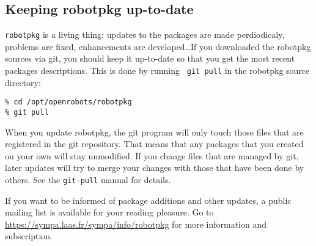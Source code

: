 \subsection{Keeping robotpkg up-to-date} %

{\tt robotpkg} is   a   living thing:    updates  to  the packages are     made
perdiodicaly,  problems are fixed,   enhancements  are developed\ldots If   you
downloaded the robotpkg sources via git, you  should keep it up-to-date so that
you get the most  recent packages descriptions. This is done by running {\tt
git pull} in the robotpkg source directory:

\begin{verbatim}
% cd /opt/openrobots/robotpkg
% git pull
\end{verbatim}

When you update robotpkg, the git program will only  touch those files that are
registered in the git repository. That means that any packages that you created
on your own will stay unmodified. If you change  files that are managed by git,
later updates will try to merge your changes with those that  have been done by
others. See the {\tt git-pull} manual for details.

If you want  to be informed  of package additions  and other  updates, a public
mailing    list  is   available    for   your    reading   pleasure.  Go     to
\url{https://sympa.laas.fr/sympa/info/robotpkg}    for   more  information  and
subscription.
